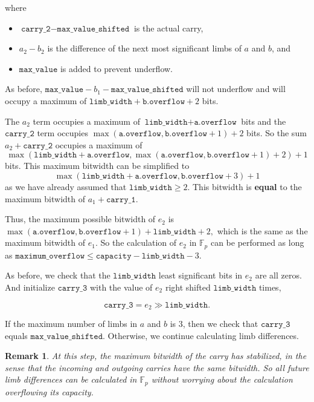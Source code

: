 \documentclass[a4paper, 12pt]{article}
\newtheorem*{remark}{Remark}
\begin{document}
\begin{itemize}
    where

    \begin{itemize}
      \item  $\texttt{carry\_2} - \texttt{max\_value\_shifted}$ is the actual carry,
      \item  $a_2 - b_2$ is the difference of the next most significant limbs of $a$ and $b$, and
      \item $\texttt{max\_value}$ is added to prevent underflow.
    \end{itemize}

    As before, $\texttt{max\_value} - b_1 - \texttt{max\_value\_shifted}$ will not underflow and will occupy a maximum of $\texttt{limb\_width} + \texttt{b.overflow} + 2$ bits.

    The $a_2$ term occupies a maximum of $\texttt{limb\_width} + \texttt{a.overflow}$ bits and the $\texttt{carry\_2}$ term occupies $\max(\texttt{a.overflow}, \texttt{b.overflow} + 1) + 2$ bits. So the sum $a_2 + \texttt{carry\_2}$ occupies a maximum of 
    $$\max(\texttt{limb\_width} + \texttt{a.overflow}, \max(\texttt{a.overflow}, \texttt{b.overflow} + 1) + 2) + 1$$
    bits. This maximum bitwidth can be simplified to 
    $$\max(\texttt{limb\_width} + \texttt{a.overflow}, \texttt{b.overflow} + 3) + 1$$
    as we have already assumed that $\texttt{limb\_width} \ge 2$. This bitwidth is \textbf{equal} to the maximum bitwidth of $a_1 + \texttt{carry\_1}$.

    Thus, the maximum possible bitwidth of $e_2$ is $\max(\texttt{a.overflow}, \texttt{b.overflow} + 1) + \texttt{limb\_width} + 2,$ which is the same as the maximum bitwidth of $e_1$. So the calculation of $e_2$ in $\mathbb{F}_p$ can be performed as long as $\texttt{maximum\_overflow} \le \texttt{capacity} - \texttt{limb\_width} - 3$.

    As before, we check that the $\texttt{limb\_width}$ least significant bits in $e_2$ are all zeros. And initialize $\texttt{carry\_3}$ with the value of $e_2$ right shifted $\texttt{limb\_width}$ times,

    $$\texttt{carry\_3} = e_2 \gg \texttt{limb\_width}.$$

    If the maximum number of limbs in $a$ and $b$ is 3, then we check that $\texttt{carry\_3}$ equals $\texttt{max\_value\_shifted}$. Otherwise, we continue calculating limb differences.

    \begin{remark}
    At this step, the maximum bitwidth of the carry has stabilized, in the sense that the incoming and outgoing carries have the same bitwidth. So all future limb differences can be calculated in $\mathbb{F}_p$ without worrying about the calculation overflowing its capacity.
    \end{remark}

\end{itemize}
\end{document}
